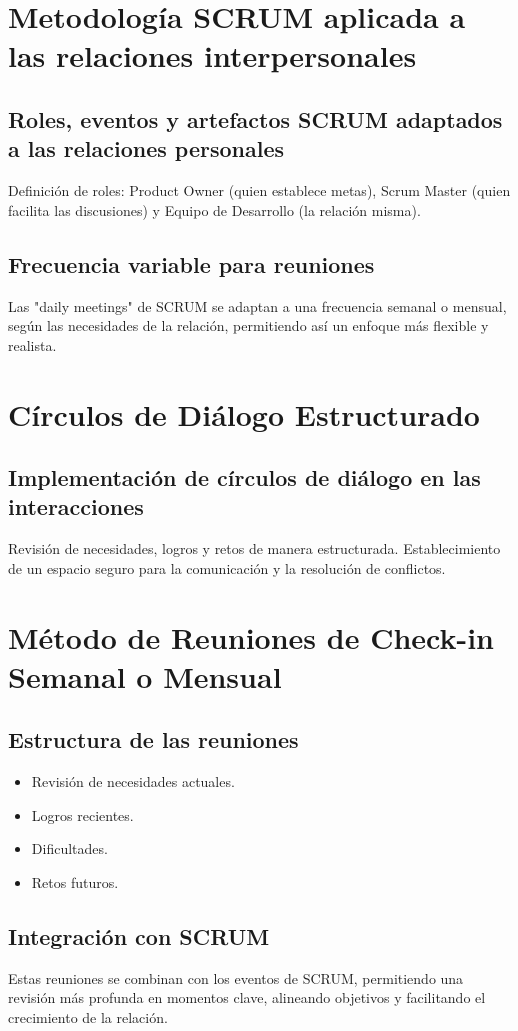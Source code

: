 \documentclass[letterpaper,12pt]{article} %
\begin{document}
	\section{Metodología SCRUM aplicada a las relaciones interpersonales}
	\subsection{Roles, eventos y artefactos SCRUM adaptados a las relaciones personales}
	Definición de roles: Product Owner (quien establece metas), Scrum Master (quien facilita las discusiones) y Equipo de Desarrollo (la relación misma).
	
	\subsection{Frecuencia variable para reuniones}
	Las "daily meetings" de SCRUM se adaptan a una frecuencia semanal o mensual, según las necesidades de la relación, permitiendo así un enfoque más flexible y realista.
	
	\section{Círculos de Diálogo Estructurado}
	\subsection{Implementación de círculos de diálogo en las interacciones}
	Revisión de necesidades, logros y retos de manera estructurada. Establecimiento de un espacio seguro para la comunicación y la resolución de conflictos.
	
	\section{Método de Reuniones de Check-in Semanal o Mensual}
	\subsection{Estructura de las reuniones}
	\begin{itemize}
		\item Revisión de necesidades actuales.
		\item Logros recientes.
		\item Dificultades.
		\item Retos futuros.
	\end{itemize}
	
	\subsection{Integración con SCRUM}
	Estas reuniones se combinan con los eventos de SCRUM, permitiendo una revisión más profunda en momentos clave, alineando objetivos y facilitando el crecimiento de la relación.
	
\end{document}
